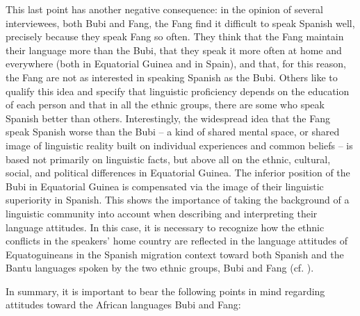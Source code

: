 \documentclass[output=paper]{langscibook}
\begin{document}
This last point has another negative consequence: in the opinion of several interviewees, both Bubi and Fang, the Fang find it difficult to speak Spanish well, precisely because they speak Fang so often. They think that the Fang maintain their language more than the Bubi, that they speak it more often at home and everywhere (both in Equatorial Guinea and in Spain), and that, for this reason, the Fang are not as interested in speaking Spanish as the Bubi. Others like to qualify this idea and specify that linguistic proficiency depends on the education of each person and that in all the ethnic groups, there are some who speak Spanish better than others. Interestingly, the widespread idea that the Fang speak Spanish worse than the Bubi – a kind of shared mental space, or shared image of linguistic reality built on individual experiences and common beliefs – is based not primarily on linguistic facts, but above all on the ethnic, cultural, social, and political differences in Equatorial Guinea. The inferior position of the Bubi in Equatorial Guinea is compensated via the image of their linguistic superiority in Spanish. This shows the importance of taking the background of a linguistic community into account when describing and interpreting their language attitudes. In this case, it is necessary to recognize how the ethnic conflicts in the speakers’ home country are reflected in the language attitudes of Equatoguineans in the Spanish migration context toward both Spanish and the Bantu languages spoken by the two ethnic groups, Bubi and Fang (cf. \citealt{schlumpf_african_2020}).

In summary, it is important to bear the following points in mind regarding attitudes toward the African languages Bubi and Fang:
\end{document}
